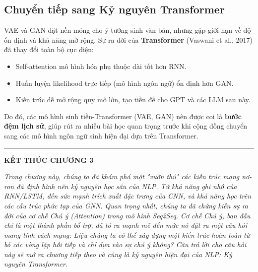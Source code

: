 \subsection{Chuyển tiếp sang Kỷ nguyên Transformer}
\label{ssec:transition_to_transformer}

VAE và GAN đặt nền móng cho ý tưởng sinh văn bản, nhưng gặp giới hạn về độ ổn định và khả năng mở rộng. Sự ra đời của \textbf{Transformer} (Vaswani et al., 2017) đã thay đổi toàn bộ cục diện:
\begin{itemize}
    \item Self-attention mô hình hóa phụ thuộc dài tốt hơn RNN.  
    \item Huấn luyện likelihood trực tiếp (mô hình ngôn ngữ) ổn định hơn GAN.  
    \item Kiến trúc dễ mở rộng quy mô lớn, tạo tiền đề cho GPT và các LLM sau này.  
\end{itemize}

Do đó, các mô hình sinh tiền-Transformer (VAE, GAN) nên được coi là \textbf{bước đệm lịch sử}, giúp rút ra nhiều bài học quan trọng trước khi cộng đồng chuyển sang các mô hình ngôn ngữ sinh hiện đại dựa trên Transformer.

\bigskip
\hrule
\bigskip

\begin{center}
    \textbf{\Large KẾT THÚC CHƯƠNG 3}
\end{center}

\textit{Trong chương này, chúng ta đã khám phá một "vườn thú" các kiến trúc mạng nơ-ron đã định hình nên kỷ nguyên học sâu của NLP. Từ khả năng ghi nhớ của RNN/LSTM, đến sức mạnh trích xuất đặc trưng của CNN, và khả năng học trên các cấu trúc phức tạp của GNN. Quan trọng nhất, chúng ta đã chứng kiến sự ra đời của cơ chế Chú ý (Attention) trong mô hình Seq2Seq. Cơ chế Chú ý, ban đầu chỉ là một thành phần bổ trợ, đã tỏ ra mạnh mẽ đến mức nó đặt ra một câu hỏi mang tính cách mạng: Liệu chúng ta có thể xây dựng một kiến trúc hoàn toàn từ bỏ các vòng lặp hồi tiếp và chỉ dựa vào sự chú ý không? Câu trả lời cho câu hỏi này sẽ mở ra chương tiếp theo và cũng là kỷ nguyên hiện đại của NLP: Kỷ nguyên Transformer.}
